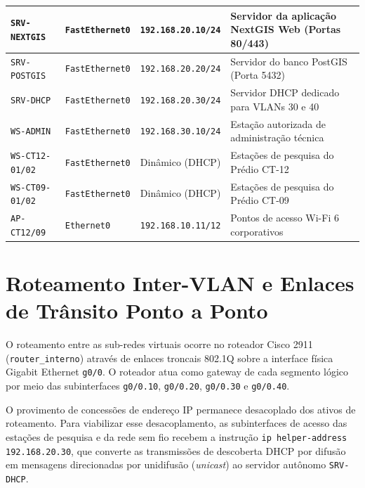 \begin{table}[htbp]
\begin{tabularx}{\textwidth}{|l|l|l|Y|}
\texttt{SRV-NEXTGIS} & \texttt{FastEthernet0} & \texttt{192.168.20.10/24} & Servidor da aplicação NextGIS Web (Portas 80/443) \\ \hline
\texttt{SRV-POSTGIS} & \texttt{FastEthernet0} & \texttt{192.168.20.20/24} & Servidor do banco PostGIS (Porta 5432) \\ \hline
\texttt{SRV-DHCP} & \texttt{FastEthernet0} & \texttt{192.168.20.30/24} & Servidor DHCP dedicado para VLANs 30 e 40 \\ \hline
\texttt{WS-ADMIN} & \texttt{FastEthernet0} & \texttt{192.168.30.10/24} & Estação autorizada de administração técnica \\ \hline
\texttt{WS-CT12-01/02} & \texttt{FastEthernet0} & Dinâmico (DHCP) & Estações de pesquisa do Prédio CT-12 \\ \hline
\texttt{WS-CT09-01/02} & \texttt{FastEthernet0} & Dinâmico (DHCP) & Estações de pesquisa do Prédio CT-09 \\ \hline
\texttt{AP-CT12/09} & \texttt{Ethernet0} & \texttt{192.168.10.11/12} & Pontos de acesso Wi-Fi 6 corporativos \\ \hline
\end{tabularx}
\end{table}

\section{Roteamento Inter-VLAN e Enlaces de Trânsito Ponto a Ponto}

O roteamento entre as sub-redes virtuais ocorre no roteador Cisco 2911 (\texttt{router\_interno}) através de enlaces troncais 802.1Q sobre a interface física Gigabit Ethernet \texttt{g0/0}. O roteador atua como gateway de cada segmento lógico por meio das subinterfaces \texttt{g0/0.10}, \texttt{g0/0.20}, \texttt{g0/0.30} e \texttt{g0/0.40}.

O provimento de concessões de endereço IP permanece desacoplado dos ativos de roteamento. Para viabilizar esse desacoplamento, as subinterfaces de acesso das estações de pesquisa e da rede sem fio recebem a instrução \texttt{ip helper-address 192.168.20.30}, que converte as transmissões de descoberta DHCP por difusão em mensagens direcionadas por unidifusão (\textit{unicast}) ao servidor autônomo \texttt{SRV-DHCP}.

